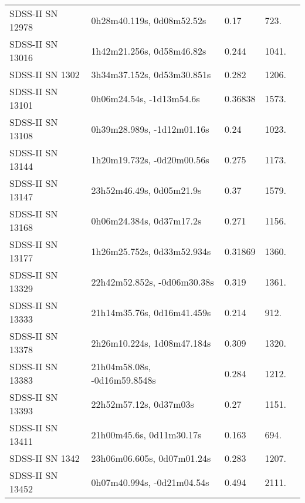 \begin{longtable}{lllll}
 SDSS-II SN 12978 &      0h28m40.119s, 0d08m52.52s &     0.17 &           723. &    \citet{2011ApJ...738..162S} \\
 SDSS-II SN 13016 &      1h42m21.256s, 0d58m46.82s &    0.244 &          1041. &    \citet{2010ApJ...713.1026D} \\
  SDSS-II SN 1302 &     3h34m37.152s, 0d53m30.851s &    0.282 &          1206. &    \citet{2011ApJ...738..162S} \\
 SDSS-II SN 13101 &       0h06m24.54s, -1d13m54.6s &  0.36838 &          1573. &    \citet{2013ApJ...763...88C} \\
 SDSS-II SN 13108 &     0h39m28.989s, -1d12m01.16s &     0.24 &          1023. &    \citet{2011ApJ...738..162S} \\
 SDSS-II SN 13144 &     1h20m19.732s, -0d20m00.56s &    0.275 &          1173. &    \citet{2010ApJ...713.1026D} \\
 SDSS-II SN 13147 &       23h52m46.49s, 0d05m21.9s &     0.37 &          1579. &    \citet{2010ApJ...713.1026D} \\
 SDSS-II SN 13168 &       0h06m24.384s, 0d37m17.2s &    0.271 &          1156. &    \citet{2011ApJ...738..162S} \\
 SDSS-II SN 13177 &     1h26m25.752s, 0d33m52.934s &  0.31869 &          1360. &    \citet{2016SDSSD.C...0000:} \\
 SDSS-II SN 13329 &    22h42m52.852s, -0d06m30.38s &    0.319 &          1361. &    \citet{2010ApJ...713.1026D} \\
 SDSS-II SN 13333 &     21h14m35.76s, 0d16m41.459s &    0.214 &           912. &    \citet{2011ApJ...738..162S} \\
 SDSS-II SN 13378 &     2h26m10.224s, 1d08m47.184s &    0.309 &          1320. &    \citet{2005ApJS..158..161H} \\
 SDSS-II SN 13383 &   21h04m58.08s, -0d16m59.8548s &    0.284 &          1212. &    \citet{2011ApJ...738..162S} \\
 SDSS-II SN 13393 &         22h52m57.12s, 0d37m03s &     0.27 &          1151. &    \citet{2011ApJ...738..162S} \\
 SDSS-II SN 13411 &       21h00m45.6s, 0d11m30.17s &    0.163 &           694. &    \citet{2011ApJ...740...92G} \\
  SDSS-II SN 1342 &     23h06m06.605s, 0d07m01.24s &    0.283 &          1207. &    \citet{2010ApJ...713.1026D} \\
 SDSS-II SN 13452 &     0h07m40.994s, -0d21m04.54s &    0.494 &          2111. &    \citet{2011ApJ...738..162S} \\

\end{longtable}
